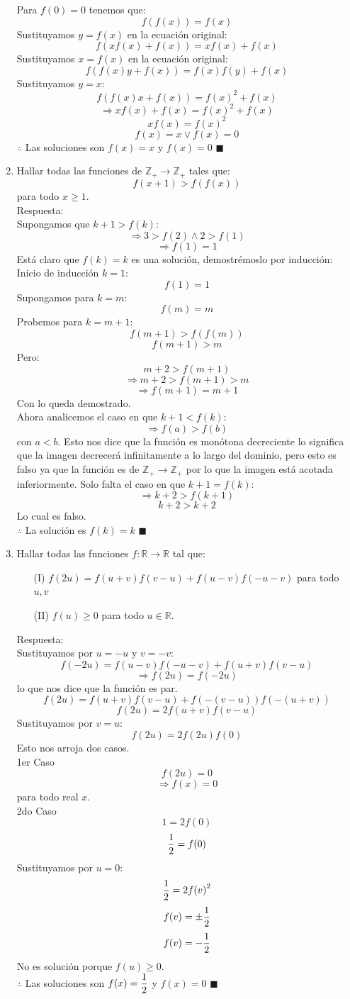 \documentclass{book}
\newcommand{\R}{\mathbb{R}} \newcommand{\N}{\mathbb{N}}
\newcommand{\Z}{\mathbb{Z}} \def\max{\mathop{\mbox{\rm máx}}} %
\begin{document}
\begin{enumerate}
Para $f(0)=0$ tenemos que:
$$f( f(x)) = f(x)$$
Sustituyamos $y=f(x)$ en la ecuación original:
$$f(xf(x)+f(x))=xf(x)+f(x)$$
Sustituyamos $x=f(x)$ en la ecuación original:
$$f(f(x)y+f(x))=f(x)f(y)+f(x)$$
Sustituyamos $y=x$:
$$f(f(x)x+f(x))=f(x)^2+f(x)$$
$$\Rightarrow xf(x)+f(x)=f(x)^2+f(x)$$
$$xf(x)=f(x)^2$$
$$f(x)=x\vee f(x)=0$$
$\therefore$ Las soluciones son $f(x)=x$ y $f(x)=0$ $\blacksquare$\\
				\item Hallar todas las funciones de $\Z_+\rightarrow\Z_+$ tales que:
			$$f(x+1)>f(f(x))$$
			para todo $x\geq1$.\\
			Respuesta:\\
			Supongamos que $k+1>f(k)$:
$$\Rightarrow 3> f(2) \wedge 2>f(1)$$
$$\Rightarrow f(1)=1$$
Está claro que $f(k)=k$ es una solución, demostrémoslo por inducción:\\
Inicio de inducción $k=1$:
$$f(1)=1$$
Supongamos para $k=m$:
$$f(m)=m$$
Probemos para $k=m+1$:
$$f(m+1)>f(f(m))$$
$$f(m+1)>m$$
Pero:
$$m+2>f(m+1)$$
$$\Rightarrow m+2>f(m+1)>m$$
$$\Rightarrow f(m+1)=m+1$$
Con lo queda demostrado.\\
Ahora analicemos el caso en que $k+1<f(k)$:
$$\Rightarrow f(a)>f(b)$$
con $a<b$. Esto nos dice que la función es monótona decreciente lo significa que la imagen decrecerá infinitamente a lo largo del dominio, pero esto es falso ya que la función es de $\Z_+\rightarrow \Z_+$ por lo que la imagen está acotada inferiormente.
Solo falta el caso en que $k+1=f(k)$:
$$\Rightarrow k+2>f(k+1)$$
$$k+2>k+2$$
Lo cual es falso.\\
$\therefore$ La solución es $f(k)=k$ $\blacksquare$\\
				\item Hallar todas las funciones $f:\R\rightarrow\R$   tal que:
				\begin{enumerate}
					\item[(I)] $f(2u) = f(u+v)f(v-u) + f(u-v)f(-u-v)$ para todo $u,v$
					\item[(II)]$f(u) \geq  0$ para todo $u\in \R$.
				\end{enumerate}	
				Respuesta:\\
				Sustituyamos por $u=-u$ y $v=-v$:
$$f(-2u)=f(u-v)f(-u-v)+ f(u + v)f(v - u)$$ 
$$\Rightarrow f(2u)=f(-2u)$$
lo que nos dice que la función es par.
$$f(2u) = f(u + v)f(v -u) + f(-(v-u))f(-(u+v))$$
$$f(2u) = 2f(u + v)f(v -u)$$
Sustituyamos por $v=u$:
$$f(2u) = 2f(2u)f(0)$$
Esto nos arroja dos casos.\\
1er Caso
$$f(2u) =0$$
$$\Rightarrow f(x)=0$$
para todo real $x$.\\
2do Caso
$$1 = 2f(0)$$
$${1\over 2}  = f(0)$$
Sustituyamos por $u=0$:
$${1\over 2}= 2{f(v)}^2$$
$$f(v)=\pm{1\over 2}$$
$$f(v)=-{1\over 2}$$
No es solución porque $f(u)\geq  0$.\\
$\therefore$ Las soluciones son $\displaystyle{f(x)={1\over 2}}$ y $f(x)=0$ $\blacksquare$\\
				

\end{enumerate}
\end{document}
